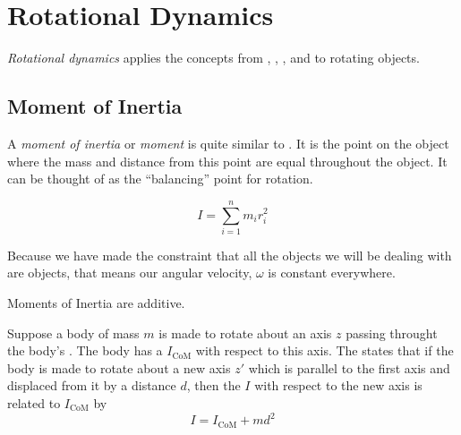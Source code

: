 \section{Rotational Dynamics}\label{sec:Rotational Dynamics}
\emph{Rotational dynamics} applies the concepts from , , , and  to rotating objects.

\subsection{Moment of Inertia}\label{subsec:Moment of Inertia}
\begin{definition}\label{def:Moment of Inertia}
  A \emph{moment of inertia} or \emph{moment} is quite similar to .
  It is the point on the object where the mass and distance from this point are equal throughout the object.
  It can be thought of as the ``balancing'' point for rotation.

  \begin{equation}\label{eq:Moment of Inertia}
    I = \sum\limits_{i=1}^{n} m_{i} r_{i}^{2}
  \end{equation}

  \begin{remark}
    Because we have made the constraint that all the objects we will be dealing with are  objects, that means our angular velocity, $\omega$ is constant everywhere.
  \end{remark}
  \begin{remark}
    Moments of Inertia are additive.
  \end{remark}
\end{definition}

\begin{theorem}\label{thm:Parallel Axis Theorem}
  Suppose a body of mass $m$ is made to rotate about an axis $z$ passing throught the body's .
  The body has a  $I_{\text{CoM}}$ with respect to this axis.
  The  states that if the body is made to rotate about a new axis $z'$ which is parallel to the first axis and displaced from it by a distance $d$, then the  $I$ with respect to the new axis is related to $I_{\text{CoM}}$ by
  \begin{equation}\label{eq:Parallel Axis Theorem}
    I = I_{\text{CoM}} + md^{2}
  \end{equation}
\end{theorem}

